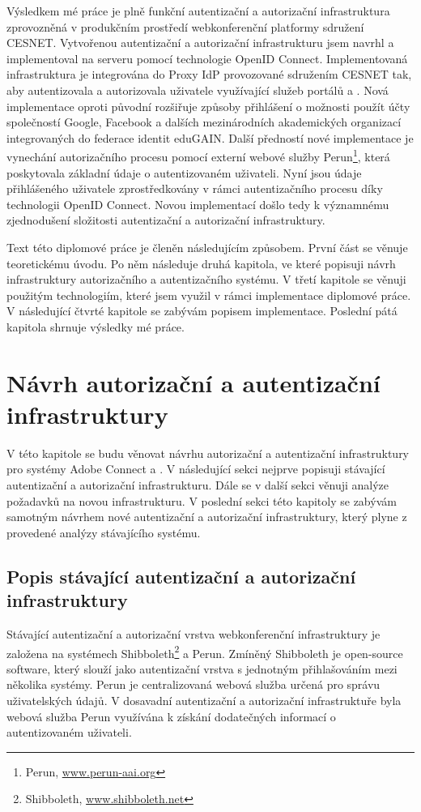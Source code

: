 \documentclass[
  printed, %
  twoside, %
  table,   %
  nolof,     %
  nolot,     %
]{fithesis3}
\begin{document}
Výsledkem mé práce je plně funkční autentizační a autorizační infrastruktura zprovozněná v produkčním prostředí webkonferenční platformy sdružení CESNET. Vytvořenou autentizační a autorizační infrastrukturu jsem navrhl a implementoval na serveru  pomocí technologie OpenID Connect. Implementovaná infrastruktura je integrována do Proxy IdP provozované sdružením CESNET tak, aby autentizovala a autorizovala uživatele využívající služeb portálů  a . Nová implementace oproti původní rozšiřuje způsoby přihlášení o možnosti použít účty společností Google, Facebook a dalších mezinárodních akademických organizací integrovaných do federace identit eduGAIN. Další předností nové implementace je vynechání autorizačního procesu pomocí externí webové služby Perun\footnote{Perun, \url{www.perun-aai.org}}, která poskytovala základní údaje o autentizovaném uživateli. Nyní jsou údaje přihlášeného uživatele zprostředkovány v rámci autentizačního procesu díky technologii OpenID Connect. Novou implementací došlo tedy k významnému zjednodušení složitosti autentizační a autorizační infrastruktury. \par

Text této diplomové práce je členěn následujícím způsobem. První část se věnuje teoretickému úvodu. Po něm následuje druhá kapitola, ve které popisuji návrh infrastruktury autorizačního a autentizačního systému. V třetí kapitole se věnuji použitým technologiím, které jsem využil v rámci implementace diplomové práce. V následující čtvrté kapitole se zabývám popisem implementace. Poslední pátá kapitola shrnuje výsledky mé práce. 

\chapter{Návrh autorizační a autentizační infrastruktury}
V této kapitole se budu věnovat návrhu autorizační a autentizační infrastruktury pro systémy Adobe Connect a . V následující sekci nejprve popisuji stávající autentizační a autorizační infrastrukturu. Dále se v další sekci věnuji analýze požadavků na novou infrastrukturu. V poslední sekci této kapitoly se zabývám samotným návrhem nové autentizační a autorizační infrastruktury, který plyne z provedené analýzy stávajícího systému.    

\section{Popis stávající autentizační a autorizační infrastruktury}
Stávající autentizační a autorizační vrstva webkonferenční infrastruktury je založena na systémech Shibboleth\footnote{Shibboleth, \url{www.shibboleth.net}} a Perun. Zmíněný Shibboleth je open-source software, který slouží jako autentizační vrstva s jednotným přihlašováním mezi několika systémy. Perun \cite{perunPresentation} je centralizovaná webová služba určená pro správu uživatelských údajů. V dosavadní autentizační a autorizační infrastruktuře byla webová služba Perun využívána k získání dodatečných informací o autentizovaném uživateli. \par
\end{document}

